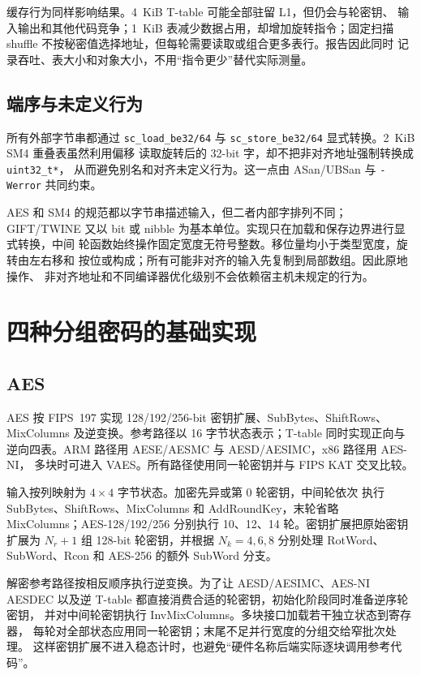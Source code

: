 \documentclass[11pt,a4paper,UTF8,fontset=none]{ctexart}
\begin{document}
缓存行为同样影响结果。4~KiB T-table 可能全部驻留 L1，但仍会与轮密钥、
输入输出和其他代码竞争；1~KiB 表减少数据占用，却增加旋转指令；固定扫描
shuffle 不按秘密值选择地址，但每轮需要读取或组合更多表行。报告因此同时
记录吞吐、表大小和对象大小，不用“指令更少”替代实际测量。

\subsection{端序与未定义行为}

所有外部字节串都通过 \texttt{sc\_load\_be32/64} 与
\texttt{sc\_store\_be32/64} 显式转换。2~KiB SM4 重叠表虽然利用偏移
读取旋转后的 32-bit 字，却不把非对齐地址强制转换成 \texttt{uint32\_t*}，
从而避免别名和对齐未定义行为。这一点由 ASan/UBSan 与
\texttt{-Werror} 共同约束。

AES 和 SM4 的规范都以字节串描述输入，但二者内部字排列不同；GIFT/TWINE
又以 bit 或 nibble 为基本单位。实现只在加载和保存边界进行显式转换，中间
轮函数始终操作固定宽度无符号整数。移位量均小于类型宽度，旋转由左右移和
按位或构成；所有可能非对齐的输入先复制到局部数组。因此原地操作、
非对齐地址和不同编译器优化级别不会依赖宿主机未规定的行为。

\section{四种分组密码的基础实现}

\subsection{AES}

AES 按 FIPS~197 实现 128/192/256-bit 密钥扩展、SubBytes、ShiftRows、
MixColumns 及逆变换。参考路径以 16 字节状态表示；T-table 同时实现正向与
逆向四表。ARM 路径用 AESE/AESMC 与 AESD/AESIMC，x86 路径用 AES-NI，
多块时可进入 VAES。所有路径使用同一轮密钥并与 FIPS KAT 交叉比较。

输入按列映射为 \(4\times4\) 字节状态。加密先异或第 0 轮密钥，中间轮依次
执行 SubBytes、ShiftRows、MixColumns 和 AddRoundKey，末轮省略
MixColumns；AES-128/192/256 分别执行 10、12、14 轮。密钥扩展把原始密钥
扩展为 \(N_r+1\) 组 128-bit 轮密钥，并根据 \(N_k=4,6,8\) 分别处理
RotWord、SubWord、Rcon 和 AES-256 的额外 SubWord 分支。

解密参考路径按相反顺序执行逆变换。为了让 AESD/AESIMC、AES-NI AESDEC
以及逆 T-table 都直接消费合适的轮密钥，初始化阶段同时准备逆序轮密钥，
并对中间轮密钥执行 InvMixColumns。多块接口加载若干独立状态到寄存器，
每轮对全部状态应用同一轮密钥；末尾不足并行宽度的分组交给窄批次处理。
这样密钥扩展不进入稳态计时，也避免“硬件名称后端实际逐块调用参考代码”。
\end{document}
